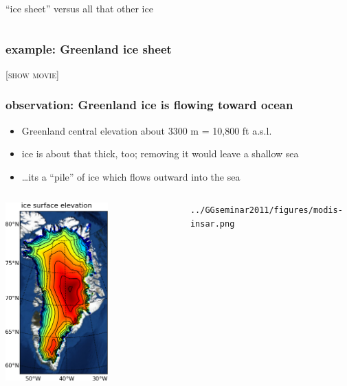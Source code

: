 \documentclass{beamer}
\begin{document}
\begin{frame}{``ice sheet'' versus all that other ice}
\begin{itemize}
\begin{columns}
\begin{column}{0.2\textwidth}
      \end{column}
      \end{columns}
  \end{itemize}
\end{frame}


\begin{frame}
  \frametitle{example: Greenland ice sheet}
  
\bigskip\bigskip
\begin{center}
\textsc{[show movie]}
\end{center}
\vfill
\end{frame}


\begin{frame}
  \frametitle{observation: Greenland ice is flowing toward ocean}

\begin{itemize}
\small
\item Greenland central elevation about 3300 m = 10,800 ft a.s.l.
\item ice is about that thick, too; removing it would leave a shallow sea
\item \dots its a ``pile'' of ice which flows outward into the sea
\normalsize
\end{itemize}

\begin{columns}
\begin{column}{0.5\textwidth}
\begin{center}
    \includegraphics[width=0.6\textwidth]{Greenland_usurf}
\end{center}
\end{column}
\begin{column}{0.5\textwidth}
\begin{center}
    \texttt{../GGseminar2011/figures/modis-insar.png}


\end{center}
\end{column}
\end{columns}
\end{frame}
\end{document}
